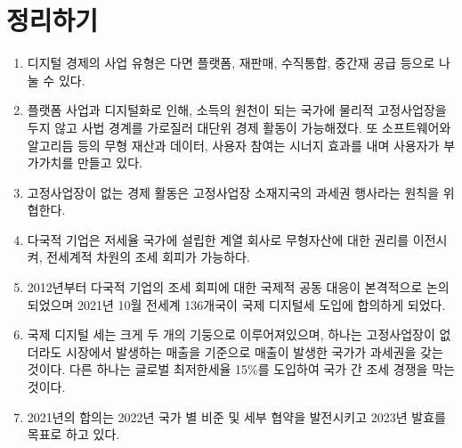 \pagebreak

\section*{정리하기}
\begin{enumerate}
\item 디지털 경제의 사업 유형은 다면 플랫폼, 재판매, 수직통합, 중간재 공급 등으로 나눌 수 있다.
\item 플랫폼 사업과 디지털화로 인해, 소득의 원천이 되는 국가에 물리적 고정사업장을 두지 않고 사법 경계를 가로질러 대단위 경제 활동이 가능해졌다. 또 소프트웨어와 알고리듬 등의 무형 재산과 데이터, 사용자 참여는 시너지 효과를 내며 사용자가 부가가치를 만들고 있다.
\item 고정사업장이 없는 경제 활동은 고정사업장 소재지국의 과세권 행사라는 원칙을 위협한다.
\item 다국적 기업은 저세율 국가에 설립한 계열 회사로 무형자산에 대한 권리를 이전시켜, 전세계적 차원의 조세 회피가 가능하다.
\item 2012년부터 다국적 기업의 조세 회피에 대한 국제적 공동 대응이 본격적으로 논의되었으며 2021년 10월 전세계 136개국이 국제 디지털세 도입에 합의하게 되었다.
\item 국제 디지털 세는 크게 두 개의 기둥으로 이루어져있으며, 하나는 고정사업장이 없더라도 시장에서 발생하는 매출을 기준으로 매출이 발생한 국가가 과세권을 갖는 것이다. 다른 하나는 글로벌 최저한세율 15\%를 도입하여 국가 간 조세 경쟁을 막는 것이다.
\item 2021년의 합의는 2022년 국가 별 비준 및 세부 협약을 발전시키고 2023년 발효를 목표로 하고 있다.
\end{enumerate}